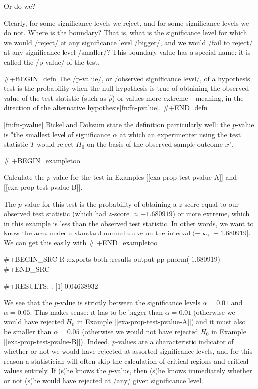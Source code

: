 Or do we?

Clearly, for some significance levels we reject, and for some
significance levels we do not. Where is the boundary? That is, what is
the significance level for which we would /reject/ at any significance
level /bigger/, and we would /fail to reject/ at any significance
level /smaller/? This boundary value has a special name: it is called
the /p-value/ of the test.

#+BEGIN_defn
The /p-value/, or /observed significance level/, of a hypothesis test
is the probability when the null hypothesis is true of obtaining the
observed value of the test statistic (such as \(\hat{p}\)) or values
more extreme -- meaning, in the direction of the alternative
hypothesis[fn:fn-pvalue].
#+END_defn

[fn:fn-pvalue] Bickel and Doksum \cite{Bickel2001} state the
definition particularly well: the \(p\)-value is "the smallest level
of significance \(\alpha\) at which an experimenter using the test
statistic \(T\) would reject \(H_{0}\) on the basis of the observed
sample outcome \(x\)".

# +BEGIN_exampletoo

Calculate the \(p\)-value for the test in Examples
[[exa-prop-test-pvalue-A]] and [[exa-prop-test-pvalue-B]].

The \(p\)-value for this test is the probability of obtaining a
\(z\)-score equal to our observed test statistic (which had
\(z\)-score \(\approx-1.680919\)) or more extreme, which in this
example is less than the observed test statistic. In other words, we
want to know the area under a standard normal curve on the interval
\((-\infty,\,-1.680919]\). We can get this easily with
# +END_exampletoo


#+BEGIN_SRC R :exports both :results output pp 
pnorm(-1.680919)
#+END_SRC

#+RESULTS:
: [1] 0.04638932

We see that the \(p\)-value is strictly between the significance
levels \(\alpha = 0.01\) and \(\alpha = 0.05\). This makes sense: it
has to be bigger than \(\alpha = 0.01\) (otherwise we would have
rejected \(H_{0}\) in Example [[exa-prop-test-pvalue-A]]) and it must also
be smaller than \(\alpha = 0.05\) (otherwise we would not have
rejected \(H_{0}\) in Example [[exa-prop-test-pvalue-B]]). Indeed,
\(p\)-values are a characteristic indicator of whether or not we would
have rejected at assorted significance levels, and for this reason a
statistician will often skip the calculation of critical regions and
critical values entirely. If (s)he knows the \(p\)-value, then (s)he
knows immediately whether or not (s)he would have rejected at /any/
given significance level.

